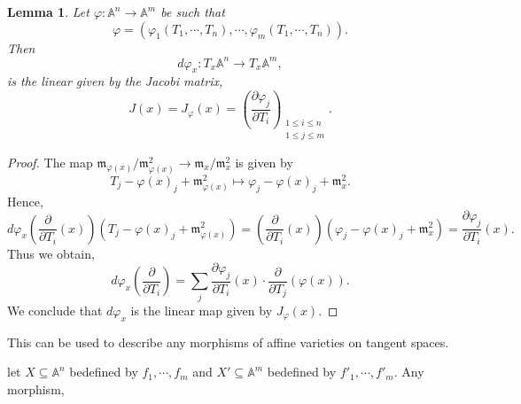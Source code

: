 \documentclass[10pt]{article}
\newtheorem{lemma}{Lemma}[section]
\numberwithin{equation}{theorem}
\DeclareMathOperator{\Ker}{ker}
\newcommand{\m}[0]{\mathfrak{m}}
\newcommand{\A}[0]{\mathbb{A}}
\begin{document}
\begin{lemma}
  \label{lemma_5_7}
  Let $\varphi:\A^n\to\A^m$ be such that 
  \begin{equation*}
    \varphi=(\varphi_1(T_1,\cdots,T_n),\cdots,\varphi_m(T_1,\cdots,T_n)).
  \end{equation*}
  Then 
  \begin{equation*}
    d\varphi_x:T_x\A^n\to T_x\A^m,
  \end{equation*}
  is the linear given by the Jacobi matrix,
  \begin{equation*}
    J(x) = J_\varphi(x) = \left({\frac {\partial\varphi_j}{\partial T_i}}\right)_{\substack{1\leq i\leq n\\ 1\leq j\leq m}}.
  \end{equation*}
\end{lemma}
\begin{proof}
  The map $\m_{\varphi(x)}/\m_{\varphi(x)}^2\to \m_x/\m_x^2$ is given by 
  \begin{equation*}
    T_j-\varphi(x)_j+\m_{\varphi(x)}^2\mapsto \varphi_j-\varphi(x)_j+\m_x^2.
  \end{equation*}
  Hence,
  \begin{equation*}
    d\varphi_x\left({\frac {\partial}{\partial T_i}(x)}\right)(T_j-\varphi(x)_j+\m_{\varphi(x)}^2) = \left({\frac {\partial}{\partial T_i}}(x)\right)(\varphi_j-\varphi(x)_j+\m_x^2) = {\frac {\partial \varphi_j}{\partial T_i}}(x).
  \end{equation*}
  Thus we obtain,
  \begin{equation*}
    d\varphi_x\left({\frac {\partial} {\partial T_i}}\right) = \sum_j {\frac {\partial\varphi_j}{\partial T_i}}(x)\cdot{\frac {\partial } {\partial T_j}}(\varphi(x)).
  \end{equation*}
  We conclude that $d\varphi_x$ is the linear map given by $J_\varphi(x)$.
\end{proof}
This can be used to describe any morphisms of affine varieties on tangent spaces.
\par let $X\subseteq \A^n$ bedefined by $f_1,\cdots,f_m$ and $X'\subseteq \A^m$ bedefined by $f'_1,\cdots,f'_m$. Any morphism,
\begin{center}
\end{center}
\begin{center}
\end{center}
\end{document}
